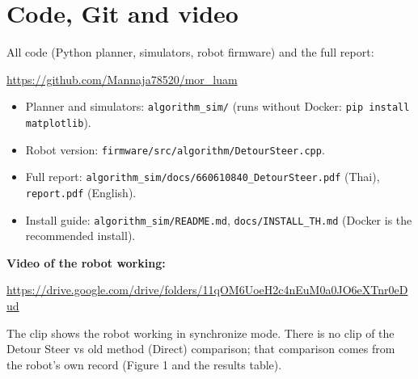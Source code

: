 \documentclass[11pt,a4paper]{article}
\begin{document}
\section*{Code, Git and video}
All code (Python planner, simulators, robot firmware) and the full report:
\begin{center}\large\url{https://github.com/Mannaja78520/mor_luam}\end{center}
\begin{itemize}\setlength\itemsep{0pt}
\item Planner and simulators: \texttt{algorithm\_sim/} (runs without Docker: \texttt{pip install matplotlib}).
\item Robot version: \texttt{firmware/src/algorithm/DetourSteer.cpp}.
\item Full report: \texttt{algorithm\_sim/docs/660610840\_DetourSteer.pdf} (Thai), \texttt{report.pdf} (English).
\item Install guide: \texttt{algorithm\_sim/README.md}, \texttt{docs/INSTALL\_TH.md} (Docker is the recommended install).
\end{itemize}

\textbf{Video of the robot working:}
\begin{center}\url{https://drive.google.com/drive/folders/11qOM6UoeH2c4nEuM0a0JO6eXTnr0eDud}\end{center}
{\small The clip shows the robot working in synchronize mode. There is no clip of the
Detour Steer vs old method (Direct) comparison; that comparison comes from the robot's own record
(Figure 1 and the results table).}
\end{document}
